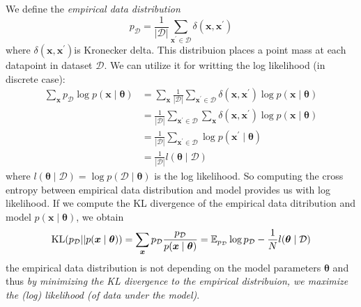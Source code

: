 We define the \textit{empirical data distribution}
$$
p_{\mathcal{D}} = \frac{1}{|\mathcal{D}|} \sum_{\boldsymbol{x}^\prime \in \mathcal{D}} \delta(\boldsymbol{x},\boldsymbol{x}^\prime)
$$
where $\delta(\boldsymbol{x},\boldsymbol{x}^\prime)$is Kronecker delta.  This distribuion places a point mass at each datapoint in dataset $\mathcal{D}$.
We can utilize it for writting the log likelihood (in discrete case):
\begin{align*}
\sum_{\boldsymbol{x}} p_{\mathcal{D}} \log p(\boldsymbol{x} \mid \boldsymbol{\theta}) &= \sum_{\boldsymbol{x}} \frac{1}{|\mathcal{D}|} \sum_{\boldsymbol{x}^\prime \in \mathcal{D}} \delta(\boldsymbol{x},\boldsymbol{x}^\prime) \log  p(\boldsymbol{x} \mid \boldsymbol{\theta}) \\
    &= \frac{1}{|\mathcal{D}|} \sum_{\boldsymbol{x}^\prime \in \mathcal{D}} \sum_{\boldsymbol{x}} \delta(\boldsymbol{x},\boldsymbol{x}^\prime) \log  p(\boldsymbol{x} \mid \boldsymbol{\theta})\\
    &= \frac{1}{|\mathcal{D}|} \sum_{\boldsymbol{x}^\prime \in \mathcal{D}} \log  p(\boldsymbol{x}^\prime \mid \boldsymbol{\theta}) \\
    &= \frac{1}{|\mathcal{D}|} l(\boldsymbol{\theta} \mid \mathcal{D})
\end{align*}
where $l(\boldsymbol{\theta} \mid \mathcal{D}) = \log p(\mathcal{D} \mid \boldsymbol{\theta})$ is the log likelihood. So computing the cross entropy between empirical data distribution and model provides us with log likelihood.
If we compute the KL divergence of the empirical data ditribution and model $p(\boldsymbol{x} \mid \boldsymbol{\theta})$, we obtain
$$
\mathrm{KL}(p_{\mathcal{D}} || p(\boldsymbol{x} \mid \boldsymbol{\theta})) = \sum_{\boldsymbol{x}} p_{\mathcal{D}} \frac{p_{\mathcal{D}}}{p(\boldsymbol{x} \mid \boldsymbol{\theta})} = \operatorname{\mathbb{E}}_{p_{\mathcal{D}}} \log p_{\mathcal{D}} - \frac{1}{N} l(\boldsymbol{\theta} \mid \mathcal{D})
$$ 
the empirical data distribution is not depending on the model parameters $\boldsymbol{\theta}$ and thus \textit{by minimizing the KL divergence to the empirical distribuion, we maximize the (log) likelihood (of data under the model)}. 
